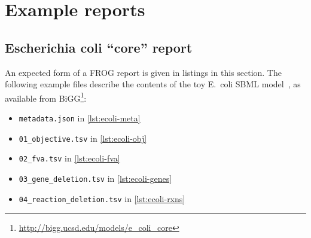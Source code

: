 \chapter{Example reports}

\section{Escherichia coli ``core'' report}

An expected form of a FROG report is given in listings in this section. The
following example files describe the contents of the toy E.~coli SBML
model~\cite{orth2010reconstruction}, as available from
BiGG\footnote{\url{http://bigg.ucsd.edu/models/e_coli_core}}:
\begin{itemize}
\item \verb|metadata.json| in \cref{lst:ecoli-meta}
\item \verb|01_objective.tsv| in \cref{lst:ecoli-obj}
\item \verb|02_fva.tsv| in \cref{lst:ecoli-fva}
\item \verb|03_gene_deletion.tsv| in \cref{lst:ecoli-genes}
\item \verb|04_reaction_deletion.tsv| in \cref{lst:ecoli-rxns}
\end{itemize}

\begin{listing}

\caption[E.~coli core metadata JSON]{FROG metadata file \texttt{metadata.json} in JSON format as generated from \texttt{e\_coli\_core.xml}. The file is available online at \url{\frogrepobase/data/ecoli/metadata.json}.}
\label{lst:ecoli-meta}
\end{listing}

\begin{listing}

\caption[E.~coli core objective report]{FROG objective report \texttt{01\_objective.tsv} in TSV format as generated from \texttt{e\_coli\_core.xml}. The file is available online at \url{\frogrepobase/data/ecoli/01_objective.json}.}
\label{lst:ecoli-obj}
\end{listing}

\begin{sidewayslisting}

\caption[E.~coli core variability report]{First 45 lines of a FROG flux variability report \texttt{02\_fva.tsv} in TSV format as generated from \texttt{e\_coli\_core.xml}. The file is available online at \url{\frogrepobase/data/ecoli/02_fva.json}.}
\label{lst:ecoli-fva}
\end{sidewayslisting}

